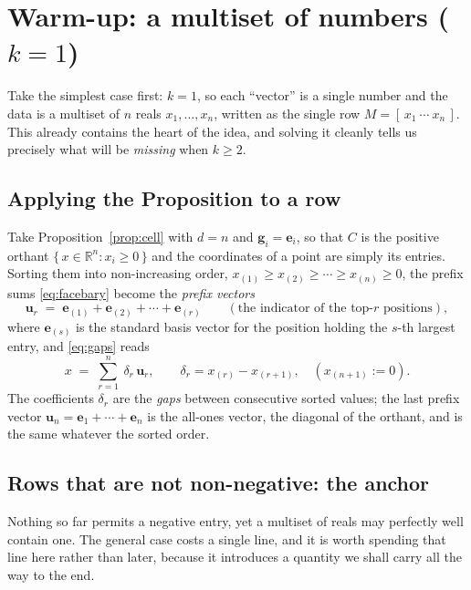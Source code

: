 \documentclass[11pt,a4paper]{article}
\theoremstyle{definition}
\theoremstyle{plain}
\newcommand{\R}{\mathbb{R}}
\newcommand{\bvec}[1]{\mathbf{#1}}
\begin{document}
\section{Warm-up: a multiset of numbers ($k=1$)}
\label{sec:numbers}

Take the simplest case first: $k=1$, so each ``vector'' is a single number and
the data is a multiset of $n$ reals $x_1,\dots,x_n$, written as the single row
$M=[\,x_1\ \cdots\ x_n\,]$. This already contains the heart of the idea, and
solving it cleanly tells us precisely what will be \emph{missing} when $k\ge2$.

\subsection{Applying the Proposition to a row}

Take Proposition~\ref{prop:cell} with $d=n$ and $\bvec g_i=\bvec e_i$, so that
$C$ is the positive orthant $\{\,x\in\R^n:x_i\ge0\,\}$ and the coordinates of a
point are simply its entries. Sorting them into non-increasing order,
$x_{(1)}\ge x_{(2)}\ge\cdots\ge x_{(n)}\ge0$, the prefix sums
\eqref{eq:facebary} become the \emph{prefix vectors}
\[
   \bvec u_r \;=\; \bvec e_{(1)}+\bvec e_{(2)}+\cdots+\bvec e_{(r)}
   \qquad(\text{the indicator of the top-$r$ positions}),
\]
where $\bvec e_{(s)}$ is the standard basis vector for the position holding the
$s$-th largest entry, and \eqref{eq:gaps} reads
\begin{equation}\label{eq:numdecomp}
   x \;=\; \sum_{r=1}^{n}\ \delta_r\,\bvec u_r,
   \qquad
   \delta_r=x_{(r)}-x_{(r+1)},\quad (x_{(n+1)}:=0).
\end{equation}
The coefficients $\delta_r$ are the \emph{gaps} between consecutive sorted
values; the last prefix vector $\bvec u_n=\bvec e_1+\cdots+\bvec e_n$ is the
all-ones vector, the diagonal of the orthant, and is the same whatever the
sorted order.

\subsection{Rows that are not non-negative: the anchor}
\label{sec:anchor}

Nothing so far permits a negative entry, yet a multiset of reals may perfectly
well contain one. The general case costs a single line, and it is worth
spending that line here rather than later, because it introduces a quantity we
shall carry all the way to the end.
\end{document}
